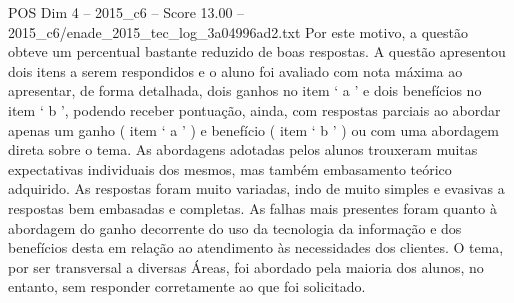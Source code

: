 \begin{textsample}{POS Dim 4 – 2015\_c6 – Score 13.00 – 2015\_c6/enade\_2015\_tec\_log\_3a04996ad2.txt}
Por este motivo, a questão obteve um percentual bastante reduzido de boas respostas.
A questão apresentou dois itens a serem respondidos e o aluno foi avaliado com nota máxima ao apresentar, de forma detalhada, dois ganhos no item ‘ a ’ e dois benefícios no item ‘ b ’, podendo receber pontuação, ainda, com respostas parciais ao abordar apenas um ganho ( item ‘ a ’ ) e benefício ( item ‘ b ’ ) ou com uma abordagem direta sobre o tema.
As abordagens adotadas pelos alunos trouxeram muitas expectativas individuais dos mesmos, mas também embasamento teórico adquirido.
As respostas foram muito variadas, indo de muito simples e evasivas a respostas bem embasadas e completas.
As falhas mais presentes foram quanto à abordagem do ganho decorrente do uso da tecnologia da informação e dos benefícios desta em relação ao atendimento às necessidades dos clientes.
O tema, por ser transversal a diversas Áreas, foi abordado pela maioria dos alunos, no entanto, sem responder corretamente ao que foi solicitado.

\end{textsample}

